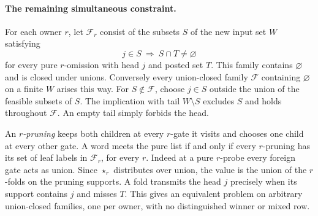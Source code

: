 \paragraph{The remaining simultaneous constraint.}
For each owner $r$, let $\mathcal F_r$ consist of the subsets $S$ of
the new input set $W$ satisfying
\[
  j\in S\ \Longrightarrow\ S\cap T\ne\varnothing
\]
for every pure $r$-omission with head $j$ and posted set $T$. This
family contains $\varnothing$ and is closed under unions. Conversely
every union-closed family $\mathcal F$ containing $\varnothing$ on a
finite $W$ arises this way. For $S\notin\mathcal F$, choose
$j\in S$ outside the union of the feasible subsets of $S$. The
implication with tail $W\setminus S$ excludes $S$ and holds throughout
$\mathcal F$. An empty tail simply forbids the head.

An \emph{$r$-pruning} keeps both children at every $r$-gate it visits
and chooses one child at every other gate. A word meets the pure list
if and only if every $r$-pruning has its set of leaf labels in
$\mathcal F_r$, for every $r$. Indeed at a pure $r$-probe every foreign
gate acts as union. Since $\star_r$ distributes over union, the value is
the union of the $r$-folds on the pruning supports. A fold transmits
the head $j$ precisely when its support contains $j$ and misses $T$.
This gives an equivalent problem on arbitrary union-closed families,
one per owner, with no distinguished winner or mixed row.

